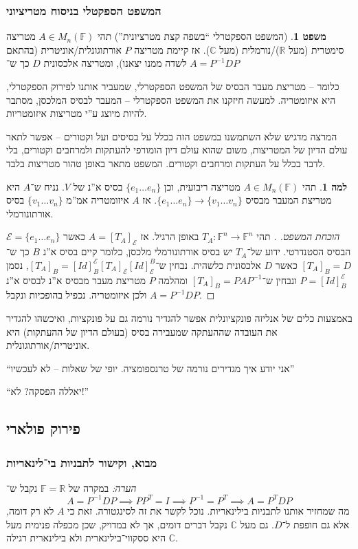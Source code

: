 \documentclass[a4paper]{article}
\newcommand\R     {\mathbb{R}}
\newcommand\C     {\mathbb{C}}
\newcommand\ec    {\mathcal{E}}
\newcommand\F         {\mathbb{F}}
\newcommand\co        {\colon}
\newcommand\op    {^{-1}}
\theoremstyle{definition}
\newtheorem{Theorem}{משפט}
\newtheorem{Lemma}{למה}
\newcommand\theo  [1] {\begin{Theorem}#1\end{Theorem}}
\newcommand\lem   [1] {\begin{Lemma}#1\end{Lemma}}
\begin{document}
	\subsubsection{המשפט הספקטלי בניסוח מטריציוני}
	\theo{(המשפט הספקטרלי ``בשפה קצת מטרציונית'') תהי $A \in M_n(\F)$ מטריצה סימטרית (מעל $\R$)/נורמלית (מעל $\C$). אז קיימת  מטריצה $P$ אורתוגונלית/אוניטרית (בהתאם לשדה ממנו יצאנו), ומטריצה אלכסונית $D$ כך ש־
		$ A = P\op D P $}
	כלומר – מטריצת מעבר הבסיס של המשפט הספקטרלי, שמעביר אותנו לפירוק הספקטרלי, היא איזומטריה. למעשה חיזקנו את המשפט הספקטרלי – המעבר לבסיס המלכסן, מסתבר להיות מיוצג ע''י מטריצות איזומטריות. 
	
	המרצה מדגיש שלא השתמשנו במשפט הזה בכלל על בסיסים ועל וקטורים – אפשר לתאר עולם הדיון של המטריצות, משום שהוא עולם דיון הומורפי להעתקות ולמרחבים וקטורים, בלי לדבר בכלל על העתקות ומרחבים וקטורים. המשפט מתאר באופן טהור מטריצות בלבד. 
	
	\lem{תהי $A \in M_n(\F)$ מטריצה ריבועית, וכן $\{e_1 \dots e_n\}$ בסיס א''נ של $V$. נניח ש־$A$ היא מטריצת המעבר מבסיס $\{e_1 \dots e_n\} \to \{v_1 \dots v_n\}$. אז $A$ איזומטריה אמ''מ $\{v_1 \dots v_n\}$ בסיס אורתונורמלי. }
	\begin{proof}[הוכחת המשפט. ]
		תהי $T_A \co \F^n \to \F^n$ באופן הרגיל. אז $A= [T_A]_\ec$ כאשר $\ec = \{e_1 \dots e_n\}$ הבסיס הסטנדרטי. ידוע של־$T_A$ יש בסיס אורתונורמלי מלכסן, כלומר קיים בסיס א''נ $B$ כך ש־$[T_A]_B = D$ כאשר $D$ אלכסונית כלשהית. נבחין ש־$[T_A]_B = [Id]^\ec_B [T_A]_\ec [Id]_\ec^B$, נסמן $P = [Id]^\ec_B$ ונבחין ש־$[T_A]_B = PAP\op$ ומהלמה $P$ מטריצת מעבר מבסיס א''נ לבסיס א''נ ולכן איזומטריה. נכפיל בהופכיות ונקבל $A = P\op DP$. 
	\end{proof}
	
	
	באמצעות כלים של אנליזה פונקציונלית אפשר להגדיר נורמה גם על פונקציות, ואיכשהו להגדיר את העובדה שההעתקה שמעבירה בסיס (בעולם הדיון של ההעתקות) היא אוניטרית/אורתוגונלית. 
	
	``אני יודע איך מגדירים נורמה של טרנספומציה. יופי של שאלות – לא לעכשיו''
	
	``יאללה הפסקה? לא!''
	
	\subsection{פירוק פולארי}
	\subsubsection{מבוא, וקישור לתבניות בי־לינאריות}
	\textit{הערה: }במקרה של $\F= \R$ נקבל ש־
	\[ A = P\op DP \implies PP^T = I \implies P\op = P^T \implies A = P^TDP \]
	מה שמחזיר אותנו לתבניות בילינאריות. נוכל לקשר את זה לסינגטורה. זאת כי $A$ לא רק דומה, אלא גם חופפת ל־$D$. גם מעל $\C$ נקבל דברים דומים, אך לא במדויק, שכן מכפלה פנימית מעל $\C$ היא ססקווי־בילינארית ולא בילינארית רגילה. 
	
\end{document}
